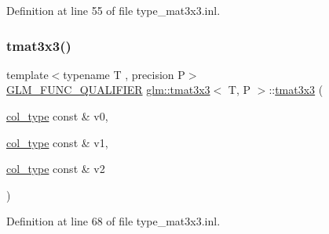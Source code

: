 Definition at line 55 of file type\+\_\+mat3x3.\+inl.

\mbox{\label{structglm_1_1tmat3x3_a600f68b1c8033fa18fb64fc3dfd5b6eb}} 
\subsubsection{\texorpdfstring{tmat3x3()}{tmat3x3()}\hspace{0.1cm}{\footnotesize\ttfamily [7/22]}}
{\footnotesize\ttfamily template$<$typename T , precision P$>$ \\
\mbox{\hyperlink{setup_8hpp_a33fdea6f91c5f834105f7415e2a64407}{G\+L\+M\+\_\+\+F\+U\+N\+C\+\_\+\+Q\+U\+A\+L\+I\+F\+I\+ER}} \mbox{\hyperlink{structglm_1_1tmat3x3}{glm\+::tmat3x3}}$<$ T, P $>$\+::\mbox{\hyperlink{structglm_1_1tmat3x3}{tmat3x3}} (\begin{DoxyParamCaption}\item[{\mbox{\hyperlink{structglm_1_1tmat3x3_a0b80bddb3cb4e01aa04d1c7a5a47365a}{col\+\_\+type}} const \&}]{v0,  }\item[{\mbox{\hyperlink{structglm_1_1tmat3x3_a0b80bddb3cb4e01aa04d1c7a5a47365a}{col\+\_\+type}} const \&}]{v1,  }\item[{\mbox{\hyperlink{structglm_1_1tmat3x3_a0b80bddb3cb4e01aa04d1c7a5a47365a}{col\+\_\+type}} const \&}]{v2 }\end{DoxyParamCaption})}



Definition at line 68 of file type\+\_\+mat3x3.\+inl.

\mbox{\label{structglm_1_1tmat3x3_a02ca559b77e60d87c9511b1da01181c9}} 
